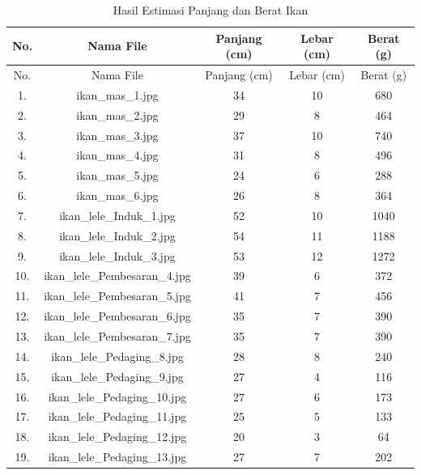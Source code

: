 \begin{longtable}{|c|c|c|c|c|}

        \caption{Hasil Estimasi Panjang dan Berat Ikan}\label{tab:Hasil Deteksi} \\
        \hline
        No. & Nama File & Panjang (cm) & Lebar (cm) & Berat (g) \\
        \hline
        \endfirsthead
        \hline
        No. & Nama File & Panjang (cm) & Lebar (cm) & Berat (g) \\
        \hline
        \endhead

        1. & ikan\_mas\_1.jpg & 34 & 10 & 680 \\
        \hline
        2. & ikan\_mas\_2.jpg & 29 & 8 & 464 \\
        \hline
        3. & ikan\_mas\_3.jpg & 37 & 10 & 740 \\
        \hline
        4. & ikan\_mas\_4.jpg & 31 &  8 & 496 \\
        \hline
        5. & ikan\_mas\_5.jpg & 24 & 6 & 288 \\
        \hline
        6. & ikan\_mas\_6.jpg & 26 & 8 & 364 \\
        \hline
        7. & ikan\_lele\_Induk\_1.jpg & 52 & 10 & 1040 \\
        \hline
        8. & ikan\_lele\_Induk\_2.jpg & 54 & 11 & 1188 \\
        \hline
        9. & ikan\_lele\_Induk\_3.jpg & 53 & 12 & 1272 \\
        \hline
        10. & ikan\_lele\_Pembesaran\_4.jpg & 39 & 6 & 372 \\
        \hline
        11. & ikan\_lele\_Pembesaran\_5.jpg & 41 & 7 & 456 \\
        \hline
        12. & ikan\_lele\_Pembesaran\_6.jpg & 35 & 7 & 390 \\
        \hline
        13. & ikan\_lele\_Pembesaran\_7.jpg & 35 & 7 & 390 \\
        \hline
        14. & ikan\_lele\_Pedaging\_8.jpg & 28 & 8 & 240 \\
        \hline
        15. & ikan\_lele\_Pedaging\_9.jpg & 27 & 4 & 116 \\
        \hline
        16. & ikan\_lele\_Pedaging\_10.jpg & 27 & 6 & 173 \\
        \hline
        17. & ikan\_lele\_Pedaging\_11.jpg & 25 & 5 & 133 \\
        \hline
        18. & ikan\_lele\_Pedaging\_12.jpg & 20 & 3 & 64 \\
        \hline
        19. & ikan\_lele\_Pedaging\_13.jpg & 27 & 7 & 202 \\

\end{longtable}
